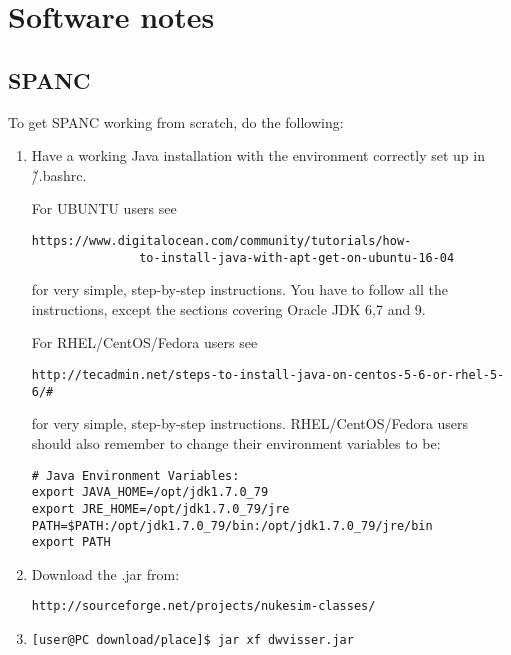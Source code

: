 \documentclass[11pt]{report}
\begin{document}
\clearpage

\appendix

\chapter{Software notes}\label{chap:softnotes}

\section{SPANC}

To get SPANC working from scratch, do the following:
\begin{enumerate}
\item
Have a working Java installation with the environment correctly set up in \~/.bashrc.

For UBUNTU users see
\begin{verbatim} 
https://www.digitalocean.com/community/tutorials/how-
               to-install-java-with-apt-get-on-ubuntu-16-04
\end{verbatim} 
for very simple, step-by-step instructions.
You have to follow all the instructions, except the sections covering Oracle JDK 6,7 and 9.


For RHEL/CentOS/Fedora  users see
\begin{verbatim} 
http://tecadmin.net/steps-to-install-java-on-centos-5-6-or-rhel-5-6/#
\end{verbatim} 
for very simple, step-by-step instructions.
RHEL/CentOS/Fedora users should also remember to change their
environment variables to be:
\begin{verbatim}
# Java Environment Variables:
export JAVA_HOME=/opt/jdk1.7.0_79
export JRE_HOME=/opt/jdk1.7.0_79/jre
PATH=$PATH:/opt/jdk1.7.0_79/bin:/opt/jdk1.7.0_79/jre/bin
export PATH
\end{verbatim} 

\item
Download the .jar from: 
\begin{verbatim} 
http://sourceforge.net/projects/nukesim-classes/
\end{verbatim} 

\item
\begin{verbatim} 
[user@PC download/place]$ jar xf dwvisser.jar
\end{verbatim} 


\end{enumerate}
\end{document}
